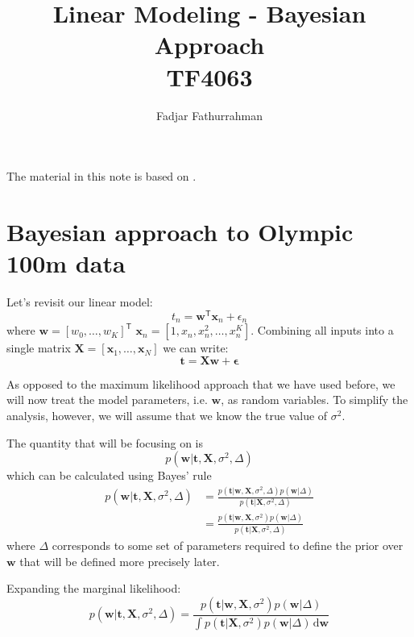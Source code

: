 \documentclass[a4paper,11pt]{article} %
\begin{document}
\title{Linear Modeling - Bayesian Approach\\
TF4063}
\author{Fadjar Fathurrahman}
\date{}
\maketitle

The material in this note is based on \cite{Rogers2017}.

\section{Bayesian approach to Olympic 100m data}

Let's revisit our linear model:
\begin{equation}
t_{n} = \mathbf{w}^{\mathsf{T}}\mathbf{x}_{n} + \epsilon_{n}
\end{equation}
where $\mathbf{w} = \left[ w_{0}, \ldots, w_{K} \right]^{\mathsf{T}}$
$\mathbf{x}_{n} = \left[ 1, x_{n}, x^{2}_{n}, \ldots, x_{n}^{K} \right]$.
Combining all inputs into a single matrix
$\mathbf{X} = \left[ \mathbf{x}_{1}, \ldots, \mathbf{x}_{N} \right]$
we can write:
\begin{equation}
\mathbf{t} = \mathbf{Xw} + \boldsymbol{\epsilon}
\end{equation}

As opposed to the maximum likelihood approach that we have used before,
we will now treat the model parameters, i.e. $\mathbf{w}$, as random variables.
To simplify the analysis, however, we will assume that we know the true value
of $\sigma^2$.

The quantity that will be focusing on is
\begin{equation}
p(\mathbf{w} | \mathbf{t}, \mathbf{X}, \sigma^2, \Delta)
\end{equation}
which can be calculated using Bayes' rule
\begin{align}
p(\mathbf{w} | \mathbf{t}, \mathbf{X}, \sigma^2, \Delta) & = 
\frac{p(\mathbf{t}|\mathbf{w},\mathbf{X},\sigma^2,\Delta) p(\mathbf{w} | \Delta)}%
{p(\mathbf{t} | \mathbf{X},\sigma^2,\Delta)} \\
& = \frac{p(\mathbf{t}|\mathbf{w},\mathbf{X},\sigma^2) p(\mathbf{w} | \Delta)}%
{p(\mathbf{t} | \mathbf{X},\sigma^2,\Delta)}
\end{align}
where $\Delta$ corresponds to some set of parameters required to define the prior
over $\mathbf{w}$ that will be defined more precisely later.

Expanding the marginal likelihood:
\begin{equation}
p(\mathbf{w} | \mathbf{t}, \mathbf{X}, \sigma^2, \Delta) = 
\frac{p(\mathbf{t}|\mathbf{w},\mathbf{X},\sigma^2) p(\mathbf{w} | \Delta)}%
{\int p(\mathbf{t} | \mathbf{X},\sigma^2) p(\mathbf{w}|\Delta)\,\mathrm{d}\mathbf{w}}
\end{equation}
\end{document}
